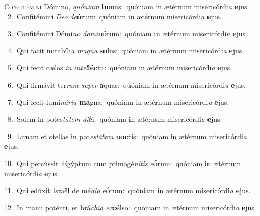 \lettrine{\initial\textcolor{\initialcolor}{C}}{onfitémini} Dómino, \textit{quón}\-\textit{i}\textit{am} \textbf{bo}\-nus:~\star quóniam in ætérnum misericórdi\textit{a} \textbf{e}\-jus.\\
{\numbfont\textcolor{\numbcolor}{~2.}}~Confitémini \textit{De}\-\textit{o} \textit{de}\-\textbf{ó}rum:~\star quóniam in ætérnum misericórdi\textit{a} \textbf{e}\-jus.\par
{\numbfont\textcolor{\numbcolor}{~3.}}~Confitémini Dómi\textit{no} \textit{do}\-\textit{mi}\textbf{nó}rum:~\star quóniam in ætérnum misericórdi\textit{a} \textbf{e}\-jus.\par
{\numbfont\textcolor{\numbcolor}{~4.}}~Qui facit mirabíli\textit{a} \textit{ma}\-\textit{gna} \textbf{so}\-lus:~\star quóniam in ætérnum misericórdi\textit{a} \textbf{e}\-jus.\par
{\numbfont\textcolor{\numbcolor}{~5.}}~Qui fecit cælos \textit{in} \textit{in}\-\textit{tel}\textbf{léc}tu:~\star quóniam in ætérnum misericórdi\textit{a} \textbf{e}\-jus.\par
{\numbfont\textcolor{\numbcolor}{~6.}}~Qui firmávit ter\textit{ram} \textit{su}\-\textit{per} \textbf{a}\-quas:~\star quóniam in ætérnum misericórdi\textit{a} \textbf{e}\-jus.\par
{\numbfont\textcolor{\numbcolor}{~7.}}~Qui fecit lumi\-\textit{ná}\-\textit{ri}\textit{a} \textbf{ma}\-gna:~\star quóniam in ætérnum misericórdi\textit{a} \textbf{e}\-jus.\par
{\numbfont\textcolor{\numbcolor}{~8.}}~Solem in potes\-\textit{tá}\-\textit{tem} \textit{di}\-\textbf{é}i:~\star quóniam in ætérnum misericórdi\textit{a} \textbf{e}\-jus.\par
{\numbfont\textcolor{\numbcolor}{~9.}}~Lunam et stellas in pot\-\textit{es}\-\textit{tá}\textit{tem} \textbf{noc}\-tis:~\star quóniam in ætérnum misericórdi\textit{a} \textbf{e}\-jus.\par
{\numbfont\textcolor{\numbcolor}{10.}}~Qui percússit Ægýptum cum primogé\-\textit{ni}\-\textit{tis} \textit{e}\-\textbf{ó}rum:~\star quóniam in ætérnum misericórdi\textit{a} \textbf{e}\-jus.\par
{\numbfont\textcolor{\numbcolor}{11.}}~Qui edúxit Israël de mé\-\textit{di}\-\textit{o} \textit{e}\-\textbf{ó}rum:~\star quóniam in ætérnum misericórdi\textit{a} \textbf{e}\-jus.\par
{\numbfont\textcolor{\numbcolor}{12.}}~In manu poténti, et brá\-\textit{chi}\-\textit{o} \textit{ex}\-\textbf{cél}so:~\star quóniam in ætérnum misericórdi\textit{a} \textbf{e}\-jus.\par
